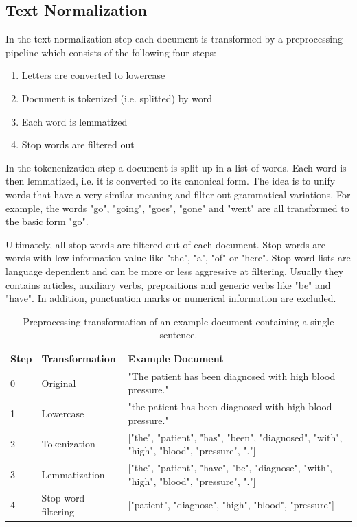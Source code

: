 \subsection{Text Normalization}

In the text normalization step each document is transformed by a preprocessing pipeline which consists of the following four steps:

\begin{enumerate} 
	\item Letters are converted to lowercase
	\item Document is tokenized (i.e. splitted) by word
	\item Each word is lemmatized
	\item Stop words are filtered out
\end{enumerate}

In the tokenenization step a document is split up in a list of words.
Each word is then lemmatized, i.e. it is converted to its canonical form.
The idea is to unify words that have a very similar meaning and filter out grammatical variations.
For example, the words  "go", "going", "goes", "gone" and "went" are all transformed to the basic form "go".

Ultimately, all stop words are filtered out of each document.
Stop words are words with low information value like "the", "a", "of" or "here".
Stop word lists are language dependent and can be more or less aggressive at filtering.
Usually they contains articles, auxiliary verbs, prepositions and generic verbs like "be" and "have".
In addition, punctuation marks or numerical information are excluded.

\begin{table}[!htbp]
	\begin{tabularx}{\textwidth}{l l p{9.8cm}}
		\toprule
		\textbf{Step} & \textbf{Transformation} & \textbf{Example Document}                                                       \\ \midrule
		0             & Original       & "The patient has been diagnosed with high blood pressure." \\
		1             & Lowercase               & "the patient has been diagnosed with high blood pressure." \\
		2 & Tokenization  & {[}"the", "patient", "has", "been", "diagnosed", "with", "high", "blood", "pressure", "."{]} \\
		3 & Lemmatization & {[}"the", "patient", "have", "be", "diagnose", "with", "high", "blood", "pressure", "."{]}   \\
		4             & Stop word filtering     & {[}"patient", "diagnose", "high", "blood", "pressure"{]} \\ \bottomrule
	\end{tabularx}
	\caption{Preprocessing transformation of an example document containing a single sentence.}
	\label{tab:text-preprocessing}
\end{table}



